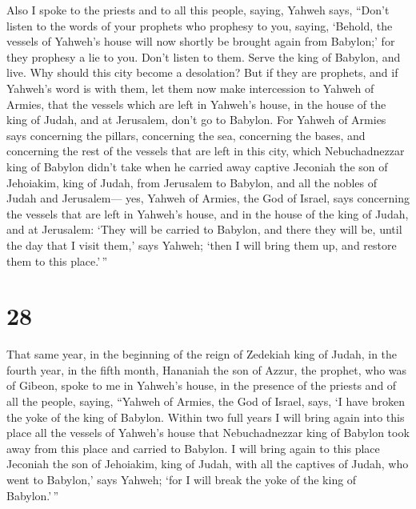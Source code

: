  Also I spoke to the priests and to all this people,
saying, Yahweh says, ``Don't listen to the words of your prophets who
prophesy to you, saying, `Behold, the vessels of Yahweh's house will now
shortly be brought again from Babylon;' for they prophesy a lie to you.
 Don't listen to them. Serve the king of Babylon, and live.
Why should this city become a desolation?  But if they are
prophets, and if Yahweh's word is with them, let them now make
intercession to Yahweh of Armies, that the vessels which are left in
Yahweh's house, in the house of the king of Judah, and at Jerusalem,
don't go to Babylon.  For Yahweh of Armies says concerning
the pillars, concerning the sea, concerning the bases, and concerning
the rest of the vessels that are left in this city,  which
Nebuchadnezzar king of Babylon didn't take when he carried away captive
Jeconiah the son of Jehoiakim, king of Judah, from Jerusalem to Babylon,
and all the nobles of Judah and Jerusalem---  yes, Yahweh
of Armies, the God of Israel, says concerning the vessels that are left
in Yahweh's house, and in the house of the king of Judah, and at
Jerusalem:  `They will be carried to Babylon, and there
they will be, until the day that I visit them,' says Yahweh; `then I
will bring them up, and restore them to this place.'\,''

\hypertarget{section-27}{%
\section{28}\label{section-27}}

 That same year, in the beginning of the reign of Zedekiah
king of Judah, in the fourth year, in the fifth month, Hananiah the son
of Azzur, the prophet, who was of Gibeon, spoke to me in Yahweh's house,
in the presence of the priests and of all the people, saying,
 ``Yahweh of Armies, the God of Israel, says, `I have broken
the yoke of the king of Babylon.  Within two full years I
will bring again into this place all the vessels of Yahweh's house that
Nebuchadnezzar king of Babylon took away from this place and carried to
Babylon.  I will bring again to this place Jeconiah the son
of Jehoiakim, king of Judah, with all the captives of Judah, who went to
Babylon,' says Yahweh; `for I will break the yoke of the king of
Babylon.'\,''

